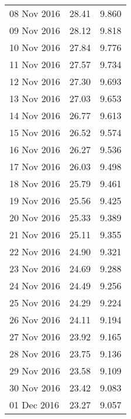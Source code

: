 \documentclass[11pt,a4paper,twoside]{article}
\begin{document}
\begin{longtable}{lcc}
08 Nov 2016                    & 28.41                & 9.860      \\
09 Nov 2016                    & 28.12                & 9.818      \\
10 Nov 2016                    & 27.84                & 9.776      \\
11 Nov 2016                    & 27.57                & 9.734      \\
12 Nov 2016                    & 27.30                & 9.693      \\
13 Nov 2016                    & 27.03                & 9.653      \\
14 Nov 2016                    & 26.77                & 9.613      \\
15 Nov 2016                    & 26.52                & 9.574      \\
16 Nov 2016                    & 26.27                & 9.536      \\
17 Nov 2016                    & 26.03                & 9.498      \\
18 Nov 2016                    & 25.79                & 9.461      \\
19 Nov 2016                    & 25.56                & 9.425      \\
20 Nov 2016                    & 25.33                & 9.389      \\
21 Nov 2016                    & 25.11                & 9.355      \\
22 Nov 2016                    & 24.90                & 9.321      \\
23 Nov 2016                    & 24.69                & 9.288      \\
24 Nov 2016                    & 24.49                & 9.256      \\
25 Nov 2016                    & 24.29                & 9.224      \\
26 Nov 2016                    & 24.11                & 9.194      \\
27 Nov 2016                    & 23.92                & 9.165      \\
28 Nov 2016                    & 23.75                & 9.136      \\
29 Nov 2016                    & 23.58                & 9.109      \\
30 Nov 2016                    & 23.42                & 9.083      \\
01 Dec 2016                    & 23.27                & 9.057      \\

\end{longtable}
\end{document}
